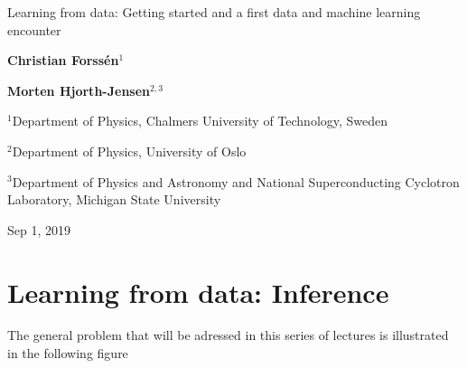\documentclass[%
oneside,                 %
final,                   %
10pt]{article}
\begin{document}

\newcommand{\exercisesection}[1]{\subsection*{#1}}







\thispagestyle{empty}

\begin{center}
{\LARGE\bf
\begin{spacing}{1.25}
Learning from data: Getting started and a first data and machine learning encounter
\end{spacing}
}
\end{center}


\begin{center}
{\bf Christian Forssén${}^{1}$} \\ [0mm]
\end{center}


\begin{center}
{\bf Morten Hjorth-Jensen${}^{2, 3}$} \\ [0mm]
\end{center}

\begin{center}
\centerline{{\small ${}^1$Department of Physics, Chalmers University of Technology, Sweden}}
\centerline{{\small ${}^2$Department of Physics, University of Oslo}}
\centerline{{\small ${}^3$Department of Physics and Astronomy and National Superconducting Cyclotron Laboratory, Michigan State University}}
\end{center}
    

\begin{center}
Sep 1, 2019
\end{center}

\vspace{1cm}


\section{Learning from data: Inference}
The general problem that will be adressed in this series of lectures is illustrated in the following figure
\end{document}
